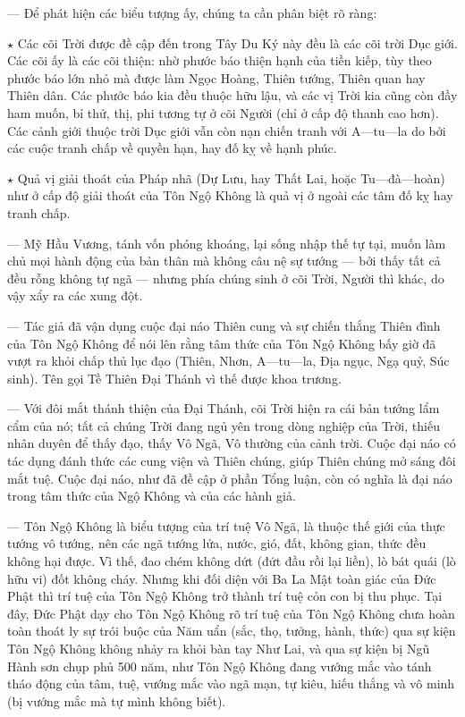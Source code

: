 — Để phát hiện các biểu tượng ấy, chúng ta cần phân biệt rõ ràng:

$\star$ Các cõi Trời được đề cập đến trong Tây Du Ký này đều là các cõi trời Dục giới. Các cõi ấy là các cõi thiện: nhờ phước báo thiện hạnh của tiền kiếp, tùy theo phước báo lớn nhỏ mà được làm Ngọc Hoàng, Thiên tướng, Thiên quan hay Thiên dân. Các phước báo kia đều thuộc hữu lậu, và các vị Trời kia cũng còn đầy ham muốn, bỉ thử, thị, phi tương tự ở cõi Người (chỉ ở cấp độ thanh cao hơn). Các cảnh giới thuộc trời Dục giới vẫn còn nạn chiến tranh với A—tu—la do bởi các cuộc tranh chấp về quyền hạn, hay đố kỵ về hạnh phúc.

$\star$ Quả vị giải thoát của Pháp nhã (Dự Lưu, hay Thất Lai, hoặc Tu—đà—hoàn) như ở cấp độ giải thoát của Tôn Ngộ Không là quả vị ở ngoài các tâm đố kỵ hay tranh chấp.

— Mỹ Hầu Vương, tánh vốn phóng khoáng, lại sống nhập thế tự tại, muốn làm chủ mọi hành động của bản thân mà không câu nệ sự tướng — bởi thấy tất cả đều rỗng không tự ngã — nhưng phía chúng sinh ở cõi Trời, Người thì khác, do vậy xẩy ra các xung đột.

— Tác giả đã vận dụng cuộc đại náo Thiên cung và sự chiến thắng Thiên đình của Tôn Ngộ Không để nói lên rằng tâm thức của Tôn Ngộ Không bấy giờ đã vượt ra khỏi chấp thủ lục đạo (Thiên, Nhơn, A—tu—la, Địa ngục, Ngạ quỷ, Súc sinh). Tên gọi Tề Thiên Đại Thánh vì thế được khoa trương.

— Với đôi mắt thánh thiện của Đại Thánh, cõi Trời hiện ra cái bản tướng lẩm cẩm của nó; tất cả chúng Trời đang ngủ yên trong dòng nghiệp của Trời, thiếu nhân duyên để thấy đạo, thấy Vô Ngã, Vô thường của cảnh trời. Cuộc đại náo có tác dụng đánh thức các cung viện và Thiên chúng, giúp Thiên chúng mở sáng đôi mắt tuệ.  Cuộc đại náo, như đã đề cập ở phần Tổng luận, còn có nghĩa là đại náo trong tâm thức của Ngộ Không và của các hành giả.

— Tôn Ngộ Không là biểu tượng của trí tuệ Vô Ngã, là thuộc thế giới của thực tướng vô tướng, nên các ngã tướng lửa, nước, gió, đất, không gian, thức đều không hại được. Vì thế, đao chém không dứt (đứt đầu rồi lại liền), lò bát quái (lò hữu vi) đốt không cháy. Nhưng khi đối diện với Ba La Mật toàn giác của Đức Phật thì trí tuệ của Tôn Ngộ Không trở thành trí tuệ cỏn con bị thu phục. Tại đây, Đức Phật dạy cho Tôn Ngộ Không rõ trí tuệ của Tôn Ngộ Không chưa hoàn toàn thoát ly sự trói buộc của Năm uẩn (sắc, thọ, tưởng, hành, thức) qua sự kiện Tôn Ngộ Không không nhảy ra khỏi bàn tay Như Lai, và qua sự kiện bị Ngũ Hành sơn chụp phủ 500 năm, như Tôn Ngộ Không đang vướng mắc vào tánh tháo động của tâm, tuệ, vướng mắc vào ngã mạn, tự kiêu, hiếu thắng và vô minh (bị vướng mắc mà tự mình không biết).

